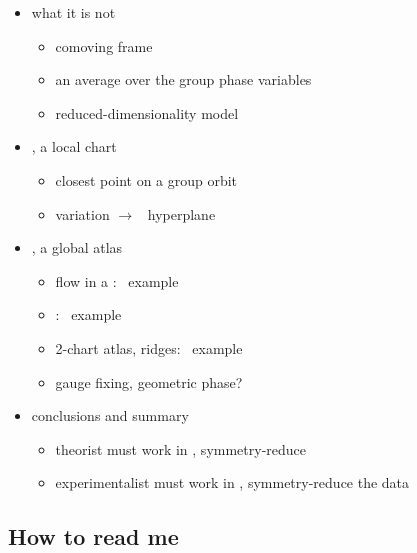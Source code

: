 \begin{itemize}
\begin{itemize}
      \item \mslices
    \end{itemize}
  \item what it is not
    \begin{itemize}
      \item comoving frame
      \item an average over the group phase variables
      \item reduced-dimensionality model
    \end{itemize}
  \item \mslices, a local chart
    \begin{itemize}
      \item closest point on a group orbit
      \item variation $\to$ \slice\ hyperplane
    \end{itemize}
  \item \mslices, a global atlas
    \begin{itemize}
      \item flow in a \slice: \cLf\ example
      \item {\chartBord}: \cLf\ example
      \item 2-chart atlas, ridges:  \cLf\ example
      \item gauge fixing, geometric phase?
    \end{itemize}
  \item conclusions and summary
      \begin{itemize}
      \item theorist must work in \statesp, symmetry-reduce
      \item experimentalist must work in \statesp,
            symmetry-reduce the data
      \end{itemize}
\end{itemize}

\newpage


\subsection{How to read me}

